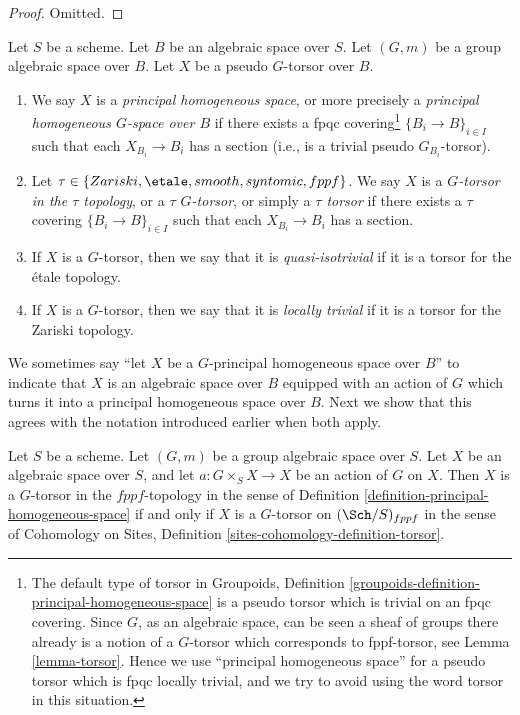 \begin{proof}
Omitted.
\end{proof}

\begin{definition}
\label{definition-principal-homogeneous-space}
Let $S$ be a scheme.
Let $B$ be an algebraic space over $S$.
Let $(G, m)$ be a group algebraic space over $B$.
Let $X$ be a pseudo $G$-torsor over $B$.
\begin{enumerate}
\item We say $X$ is a
{\it principal homogeneous space}, or more precisely a
{\it principal homogeneous $G$-space over $B$}
if there exists a fpqc covering\footnote{The default type of torsor in
Groupoids, Definition \ref{groupoids-definition-principal-homogeneous-space}
is a pseudo torsor which is trivial on an fpqc covering.
Since $G$, as an algebraic space, can be seen a sheaf of groups
there already is a notion of a $G$-torsor which corresponds
to fppf-torsor, see
Lemma \ref{lemma-torsor}.
Hence we use ``principal homogeneous space'' for a pseudo torsor which
is fpqc locally trivial, and we try to avoid using the word torsor in
this situation.}
$\{B_i \to B\}_{i \in I}$ such that each
$X_{B_i} \to B_i$ has a section (i.e., is a trivial pseudo $G_{B_i}$-torsor).
\item Let $\tau \in \{Zariski, \etale, smooth, syntomic, fppf\}$.
We say $X$ is a {\it $G$-torsor in the $\tau$ topology}, or a
{\it $\tau$ $G$-torsor}, or simply a {\it $\tau$ torsor}
if there exists a $\tau$ covering $\{B_i \to B\}_{i \in I}$
such that each $X_{B_i} \to B_i$ has a section.
\item If $X$ is a $G$-torsor, then we say that it is
{\it quasi-isotrivial} if it is a torsor for the \'etale topology.
\item If $X$ is a $G$-torsor, then we say that it is
{\it locally trivial} if it is a torsor for the Zariski topology.
\end{enumerate}
\end{definition}

\noindent
We sometimes say ``let $X$ be a $G$-principal homogeneous space over $B$''
to indicate that $X$ is an algebraic space over $B$ equipped with an
action of $G$ which turns it into a principal homogeneous space over $B$.
Next we show that this agrees with the notation introduced earlier
when both apply.

\begin{lemma}
\label{lemma-torsor}
Let $S$ be a scheme.
Let $(G, m)$ be a group algebraic space over $S$.
Let $X$ be an algebraic space over $S$, and let
$a : G \times_S X \to X$ be an action of $G$ on $X$.
Then
$X$ is a $G$-torsor in the $fppf$-topology in the sense of
Definition \ref{definition-principal-homogeneous-space}
if and only if
$X$ is a $G$-torsor on $(\Sch/S)_{fppf}$
in the sense of
Cohomology on Sites, Definition \ref{sites-cohomology-definition-torsor}.
\end{lemma}

